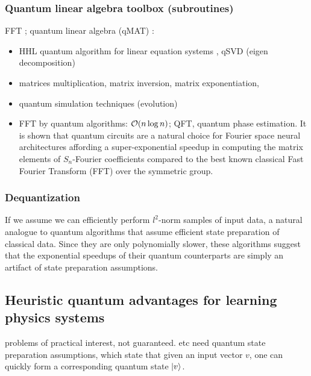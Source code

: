 \subsubsection{Quantum linear algebra toolbox (subroutines)}
FFT \cite{kondorGraphletSpectrum2009};
quantum linear algebra (qMAT) \cite{zhaoCompilingBasicLinear2019}: 
\begin{itemize}
	\item HHL quantum algorithm for linear equation systems \cite{harrowQuantumAlgorithmSolving2009}, qSVD (eigen decomposition)
	\item matrices multiplication, matrix inversion, matrix exponentiation, 
	\item quantum simulation techniques (evolution)
	\item FFT by quantum algorithms: $\mathcal{O}(n\log n)$; QFT, quantum phase estimation.
	It is shown that quantum circuits are a natural choice for Fourier space neural architectures affording a super-exponential speedup in computing the matrix elements of $S_n$-Fourier coefficients compared to the best known classical Fast Fourier Transform (FFT) over the symmetric group. \cite{zhengSpeedingLearningQuantum2022}
\end{itemize}
\cite{sornsaengQuantumDiffusionMap2021}

\subsubsection{Dequantization}
If we assume we can efficiently perform $l^2$-norm samples of input data, a natural analogue to quantum algorithms that assume efficient state preparation of classical data.
Since they are only polynomially slower, these algorithms suggest that the exponential speedups of their quantum counterparts are simply an artifact of state preparation assumptions.
\cite{tangQuantumPrincipalComponent2021}

\subsection{Heuristic quantum advantages for learning physics systems}
problems of practical interest,
not guaranteed.
\cite{rebentrostQuantumSupportVector2014} \cite{lloydQuantumPrincipalComponent2014} etc need quantum state preparation assumptions, which state that given an input vector $v$, one can quickly form a corresponding quantum state $\ket{v}$. \cite{tangQuantuminspiredClassicalAlgorithm2019}

